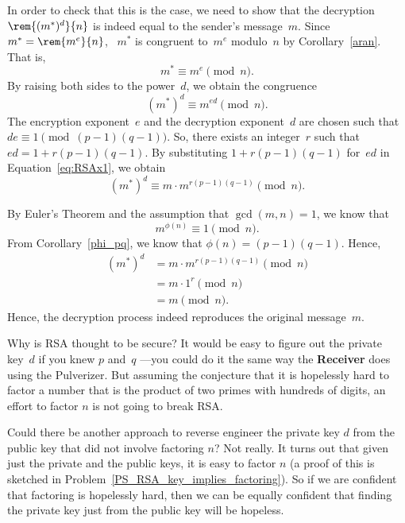 \begin{editingnotes}
In order to check that this is the case, we need to show that the decryption
$\rem{(m^*)^d}{n}$ is indeed equal to the sender's message~$m$.  Since $m^* =
\rem{m^e}{n}$, \ $m^*$ is congruent to~$m^e$ modulo~$n$ by Corollary~\ref{aran}.  That is,
\begin{equation*}
    m^* \equiv m^e \pmod n.
\end{equation*}
By raising both sides to the power~$d$, we obtain the congruence
\begin{equation}\label{eq:RSAx1}
    (m^*)^d \equiv m^{ed} \pmod n.
\end{equation}
The encryption exponent~$e$ and the decryption exponent~$d$ are chosen such that $de \equiv
1 \pmod{(p - 1)(q - 1)}$.  So, there exists an integer~$r$ such that $ed = 1 + r(p - 1)(q -
1)$.  By substituting $1 + r(p - 1)(q - 1)$ for~$ed$ in Equation~\ref{eq:RSAx1}, we obtain
\begin{equation}\label{eq:RSAx2}
    (m^*)^d \equiv m \cdot m^{r(p - 1)(q - 1)} \pmod n.
\end{equation}

By Euler's Theorem and the assumption that $\gcd(m, n) = 1$, we know that
\begin{equation*}
    m^{\phi(n)} \equiv 1 \pmod n.
\end{equation*}
From Corollary~\ref{phi_pq}, we know that $\phi(n) = (p - 1)(q - 1)$.  Hence,
\begin{align*}
(m^*)^d &= m \cdot m^{r(p-1)(q-1)} \pmod{n} \\
&= m \cdot 1^{r} \pmod{n} \\
&= m \pmod{n}.
\end{align*}
Hence, the decryption process indeed reproduces the original message~$m$.
\end{editingnotes}

Why is RSA thought to be secure?  It would be easy to figure out the
private key~$d$ if you knew $p$ and~$q$ ---you could do it the same
way the \textbf{Receiver} does using the Pulverizer.  But assuming the
conjecture that it is hopelessly hard to factor a number that is the
product of two primes with hundreds of digits, an effort to factor $n$
is not going to break RSA.

Could there be another approach to reverse engineer the private key
$d$ from the public key that did not involve factoring $n$?  Not
really.  It turns out that given just the private and the public keys,
it is easy to factor $n$ (a proof of this is sketched in
Problem~\ref{PS_RSA_key_implies_factoring}).  So if we are confident
that factoring is hopelessly hard, then we can be equally confident
that finding the private key just from the public key will be
hopeless.

